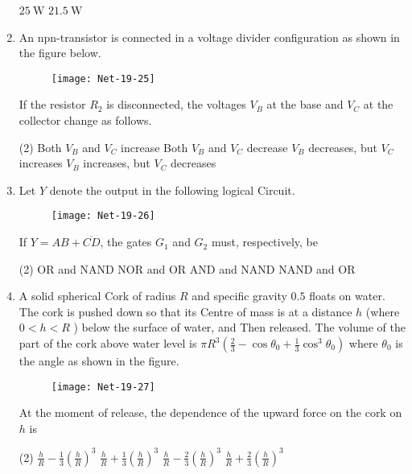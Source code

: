 \begin{enumerate}
\begin{tasks}
	\task[\textbf{c.}]$25 \mathrm{~W}$
	\task[\textbf{d.}]$21.5 \mathrm{~W}$ 
\end{tasks}
\item  An npn-transistor is connected in a voltage divider configuration as shown in the figure below.
\begin{figure}[H]
	\centering
	\texttt{[image: Net-19-25]}
\end{figure}
If the resistor $R_{2}$ is disconnected, the voltages $V_{B}$ at the base and $V_{C}$ at the collector change as follows.
 \begin{tasks}(2)
	\task[\textbf{a.}]Both $V_{B}$ and $V_{C}$ increase
	\task[\textbf{b.}]Both $V_{B}$ and $V_{C}$ decrease
	\task[\textbf{c.}]$V_{B}$ decreases, but $V_{C}$ increases
	\task[\textbf{d.}]$V_{B}$ increases, but $V_{C}$ decreases
\end{tasks}
\item  Let $Y$ denote the output in the following logical Circuit.
\begin{figure}[H]
	\centering
	\texttt{[image: Net-19-26]}
\end{figure}
If $Y=A B+\overline{C D}$, the gates $G_{1}$ and $G_{2}$ must, respectively, be
 \begin{tasks}(2)
	\task[\textbf{a.}]OR and NAND
	\task[\textbf{b.}]NOR and $\mathrm{OR}$
	\task[\textbf{c.}] AND and NAND
	\task[\textbf{d.}]  NAND and OR
\end{tasks}
\item  A solid spherical Cork of radius $R$ and specific gravity $0.5$ floats on water. The cork is pushed down so that its Centre of mass is at a distance $h$ (where $0<h<R$ ) below the surface of water, and Then released. The volume of the part of the cork above water level is $\pi R^{3}\left(\frac{2}{3}-\cos \theta_{0}+\frac{1}{3} \cos ^{3} \theta_{0}\right)$ where $\theta_{0}$ is the angle as shown in the figure.
\begin{figure}[H]
	\centering
	\texttt{[image: Net-19-27]}
\end{figure}
At the moment of release, the dependence of the upward force on the cork on $h$ is
 \begin{tasks}(2)
	\task[\textbf{a.}]$\frac{h}{R}-\frac{1}{3}\left(\frac{h}{R}\right)^{3}$
	\task[\textbf{b.}]$\frac{h}{R}+\frac{1}{3}\left(\frac{h}{R}\right)^{3}$
	\task[\textbf{c.}]$\frac{h}{R}-\frac{2}{3}\left(\frac{h}{R}\right)^{3}$
	\task[\textbf{d.}] $\frac{h}{R}+\frac{2}{3}\left(\frac{h}{R}\right)^{3}$
\end{tasks}

\end{enumerate}
